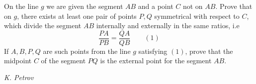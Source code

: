 On the line $g$ we are given the segment $AB$ and a point $C$ not on $AB$. Prove that on $g$, there exists at least one pair of points $P,Q$ symmetrical with respect to $C$, which divide the segment $AB$ internally and externally in the same ratios, i.e
$$\frac{PA}{PB}=\frac{QA}{QB}\qquad(1)$$If $A,B,P,Q$ are such points from the line $g$ satisfying $(1)$, prove that the midpoint $C$ of the segment $PQ$ is the external point for the segment $AB$.

\textit{K. Petrov}